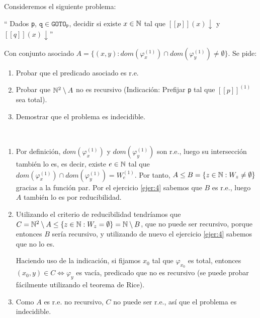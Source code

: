 \documentclass[twoside]{article}
\begin{document}
\begin{ejercicio}{10}
Consideremos el siguiente problema:


`` Dados \texttt{p}, $\texttt{q} \in \texttt{GOTO}_{\texttt{P}}$, decidir si existe $x \in \mathbb{N}$ tal que $[\![p]\!](x) \downarrow$ y $[\![q]\!](x) \downarrow$''

Con conjunto asociado $A = \{(x, y) : dom(\varphi^{(1)}_x ) \cap dom(\varphi_y^{(1)}) \neq\emptyset\}$. Se pide:
\begin{enumerate}
\item Probar que el predicado asociado es r.e.
\item Probar que $\mathbb{N}^2\setminus A$ no es recursivo (Indicación: Prefijar \texttt{p} tal que $[\![p]\!]^{(1)}$ sea total).
\item  Demostrar que el problema es indecidible.
\end{enumerate}
\end{ejercicio}
\begin{solucion}\
\begin{enumerate}
\item Por definición, $dom(\varphi^{(1)}_x )$ y $dom(\varphi_y^{(1)})$ son r.e., luego su intersección también lo es, es decir, existe $e\in\mathbb{N}$ tal que $dom(\varphi^{(1)}_x ) \cap dom(\varphi_y^{(1)})=W_e^{(1)}$. Por tanto, $A\leq B=\{z\in\mathbb{N}: W_z\neq\emptyset\}$ gracias a la función par. Por el ejercicio \ref{ejer:4} sabemos que $B$ es r.e., luego $A$ también lo es por reducibilidad.
\item Utilizando el criterio de reducibilidad tendríamos que $C=\mathbb{N}^2\setminus A\leq \{z\in\mathbb{N}: W_z=\emptyset\}=\mathbb{N}\setminus B$, que no puede ser recursivo, porque entonces $B$ sería recursivo, y utilizando de nuevo el ejercicio \ref{ejer:4} sabemos que no lo es. 

Haciendo uso de la indicación, si fijamos $x_0$ tal que $\varphi_{x_0}$ es total, entonces $(x_0,y)\in C\Leftrightarrow \varphi_y$ es vacía, predicado que no es recursivo (se puede probar fácilmente utilizando el teorema de Rice). 

\item Como $A$ es r.e. no recursivo, $C$ no puede ser r.e., así que el problema es indecidible. 
\end{enumerate}
\end{solucion}

\newpage
\end{document}
